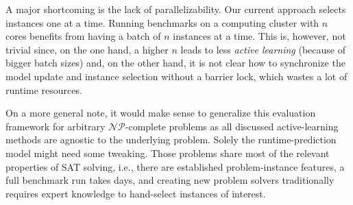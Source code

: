 \documentclass[runningheads]{llncs}
\begin{document}
A major shortcoming is the lack of parallelizability.
Our current approach selects instances one at a time.
Running benchmarks on a computing cluster with $n$ cores benefits from having a batch of $n$ instances at a time.
This is, however, not trivial since, on the one hand, a higher $n$ leads to less \emph{active learning} (because of bigger batch sizes) and, on the other hand, it is not clear how to synchronize the model update and instance selection without a barrier lock, which wastes a lot of runtime resources.

On a more general note, it would make sense to generalize this evaluation framework for arbitrary $\mathcal{NP}$-complete problems as all discussed active-learning methods are agnostic to the underlying problem.
Solely the runtime-prediction model might need some tweaking.
Those problems share most of the relevant properties of SAT solving, i.e., there are established problem-instance features, a full benchmark run takes days, and creating new problem solvers traditionally requires expert knowledge to hand-select instances of interest.


%
%


\end{document}
